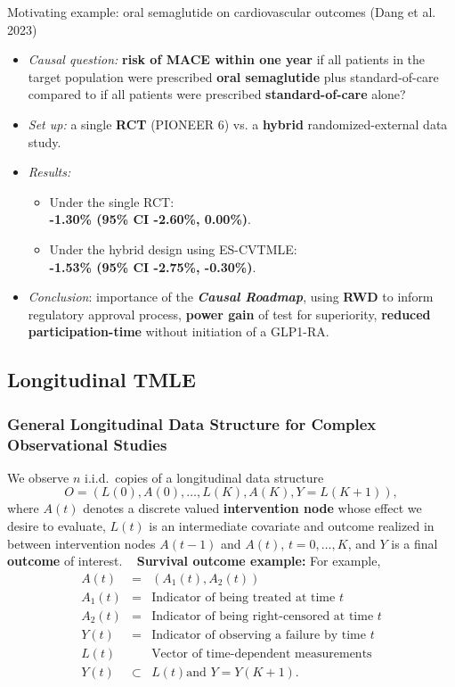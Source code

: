\documentclass[t]{beamer}
\begin{document}
\begin{frame}{Motivating example: oral semaglutide on cardiovascular outcomes (Dang et al. 2023)}
\small
\begin{itemize}
\item \textit{Causal question:} \textbf{risk of MACE within one year} if all patients in the target population were prescribed \textbf{oral semaglutide} plus standard-of-care compared to if all patients were prescribed \textbf{standard-of-care} alone?
\item \textit{Set up:} a single \textbf{RCT} (PIONEER 6) vs. a \textbf{hybrid} randomized-external data study.
\item \textit{Results:} 
  \begin{itemize}
  \item Under the single RCT: \\ \textbf{-1.30\% (95\% CI -2.60\%, 0.00\%)}. 
  \item Under the hybrid design using ES-CVTMLE: \\ \textbf{-1.53\% (95\% CI -2.75\%, -0.30\%)}.
  \end{itemize}
\item \textit{Conclusion}: importance of the \textbf{\textit{Causal Roadmap}}, using \textbf{RWD} to inform regulatory approval process, \textbf{power gain} of test for superiority, \textbf{reduced participation-time} without initiation of a GLP1-RA.
\end{itemize}
\end{frame}

\subsection{Longitudinal TMLE}

\begin{frame}
\frametitle{General Longitudinal Data Structure for Complex Observational Studies}
We observe $n$ i.i.d.~copies of a longitudinal data structure
\[
O=(L(0),A(0),\ldots,L(K),A(K),Y=L(K+1)),\]
where $A(t)$ denotes a discrete valued {\bf intervention node} whose effect we
desire to evaluate,  $L(t)$ is an intermediate covariate and outcome realized in
between intervention nodes $A(t-1)$ and $A(t)$, $t=0,\ldots,K$, and $Y$ is
a final {\bf outcome} of interest.
\ \newline
{\bf Survival outcome example:}
For example,
\begin{eqnarray*}
A(t)&=&(A_1(t),A_2(t))\\
A_1(t)&=& \mbox{Indicator of being treated at time $t$}\\
A_2(t)&=& \mbox{Indicator of being right-censored at time $t$}\\
Y(t)&=&\mbox{Indicator of observing a failure by time $t$}\\
L(t)&&\mbox{Vector of time-dependent measurements}\\
Y(t)&\subset& L(t)\mbox{and  $Y=Y(K+1)$}.
\end{eqnarray*}
\end{frame}
\end{document}
